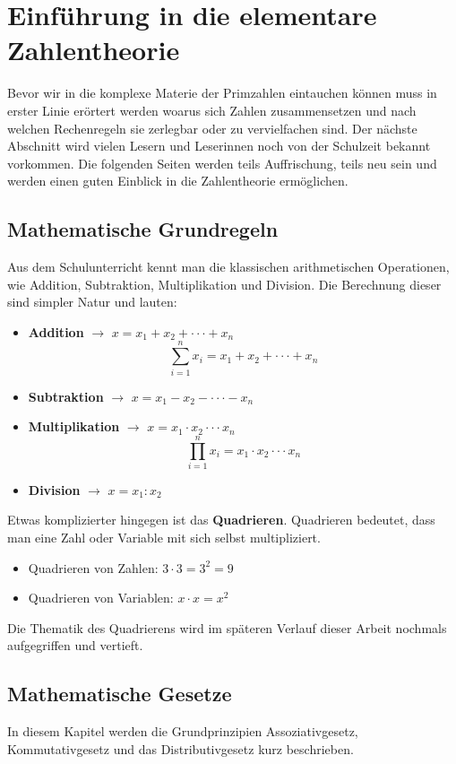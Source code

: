 \documentclass[12pt,a4paper]{article}
\theoremstyle{definition}
\begin{document}
\section{Einführung in die elementare Zahlentheorie}
Bevor wir in die komplexe Materie der Primzahlen eintauchen können muss in erster Linie erörtert werden woarus sich Zahlen zusammensetzen und nach welchen Rechenregeln sie zerlegbar oder zu vervielfachen sind.
Der nächste Abschnitt wird vielen Lesern und Leserinnen noch von der Schulzeit bekannt vorkommen.
Die folgenden Seiten werden teils Auffrischung, teils neu sein und werden einen guten Einblick in die Zahlentheorie ermöglichen.

\subsection{Mathematische Grundregeln}\label{Mathematische Grundregeln}
Aus dem Schulunterricht kennt man die klassischen arithmetischen Operationen, wie Addition, Subtraktion, Multiplikation und Division.
Die Berechnung dieser sind simpler Natur und lauten:
\begin{itemize}
\item \textbf{Addition} $\to$ $x = x_{1} + x_{2} + \cdot\cdot\cdot + x_{n}$
\[\sum_{i=1}^n x_{i} = x_{1} + x_{2} +  \cdot\cdot\cdot + x_{n}\]

\item \textbf{Subtraktion} $\to$ $x = x_{1} - x_{2} - \cdot\cdot\cdot - x_{n}$

\item \textbf{Multiplikation} $\to$ $x = x_{1} \cdot x_{2} \cdot\cdot\cdot x_{n}$
\[\prod_{i=1}^n x_{i} = x_{1} \cdot x_{2} \cdot\cdot\cdot x_{n}\]

\item \textbf{Division} $\to$ $x = x_{1} : x_{2}$
\end{itemize}

Etwas komplizierter hingegen ist das \textbf{Quadrieren}.
Quadrieren bedeutet, dass man eine Zahl oder Variable mit sich selbst multipliziert.
\begin{itemize}
\item Quadrieren von Zahlen: $3 \cdot 3 = 3^2 = 9$
\item Quadrieren von Variablen: $x \cdot x = x^2$
\end{itemize}
Die Thematik des Quadrierens wird im späteren Verlauf dieser Arbeit nochmals aufgegriffen und vertieft.

\subsection{Mathematische Gesetze}
In diesem Kapitel werden die Grundprinzipien Assoziativgesetz, Kommutativgesetz und das Distributivgesetz kurz beschrieben.
\end{document}

